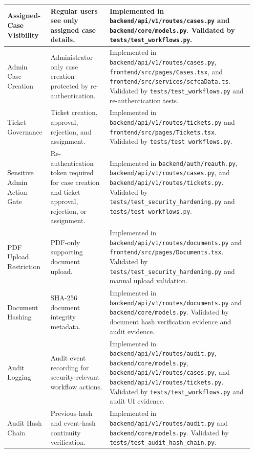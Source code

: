 \documentclass[12pt,a4paper]{report}
\begin{document}
\begin{longtable}{|p{3.0cm}|p{5.0cm}|p{7.0cm}|}
Assigned-Case Visibility & Regular users see only assigned case details. &
Implemented in \texttt{backend/api/v1/routes/cases.py} and \texttt{backend/core/models.py}. Validated by \texttt{tests/test\_workflows.py}. \\
\hline

Admin Case Creation & Administrator-only case creation protected by re-authentication. &
Implemented in \texttt{backend/api/v1/routes/cases.py}, \texttt{frontend/src/pages/Cases.tsx}, and \texttt{frontend/src/services/scfcaData.ts}. Validated by \texttt{tests/test\_workflows.py} and re-authentication tests. \\
\hline

Ticket Governance & Ticket creation, approval, rejection, and assignment. &
Implemented in \texttt{backend/api/v1/routes/tickets.py} and \texttt{frontend/src/pages/Tickets.tsx}. Validated by \texttt{tests/test\_workflows.py}. \\
\hline

Sensitive Admin Action Gate & Re-authentication token required for case creation and ticket approval, rejection, or assignment. &
Implemented in \texttt{backend/auth/reauth.py}, \texttt{backend/api/v1/routes/cases.py}, and \texttt{backend/api/v1/routes/tickets.py}. Validated by \texttt{tests/test\_security\_hardening.py} and \texttt{tests/test\_workflows.py}. \\
\hline

PDF Upload Restriction & PDF-only supporting document upload. &
Implemented in \texttt{backend/api/v1/routes/documents.py} and \texttt{frontend/src/pages/Documents.tsx}. Validated by \texttt{tests/test\_security\_hardening.py} and manual upload validation. \\
\hline

Document Hashing & SHA-256 document integrity metadata. &
Implemented in \texttt{backend/api/v1/routes/documents.py} and \texttt{backend/core/models.py}. Validated by document hash verification evidence and audit evidence. \\
\hline

Audit Logging & Audit event recording for security-relevant workflow actions. &
Implemented in \texttt{backend/api/v1/routes/audit.py}, \texttt{backend/core/models.py}, \texttt{backend/api/v1/routes/cases.py}, and \texttt{backend/api/v1/routes/tickets.py}. Validated by \texttt{tests/test\_workflows.py} and audit UI evidence. \\
\hline

Audit Hash Chain & Previous-hash and event-hash continuity verification. &
Implemented in \texttt{backend/api/v1/routes/audit.py} and \texttt{backend/core/models.py}. Validated by \texttt{tests/test\_audit\_hash\_chain.py}. \\
\hline


\end{longtable}
\end{document}
